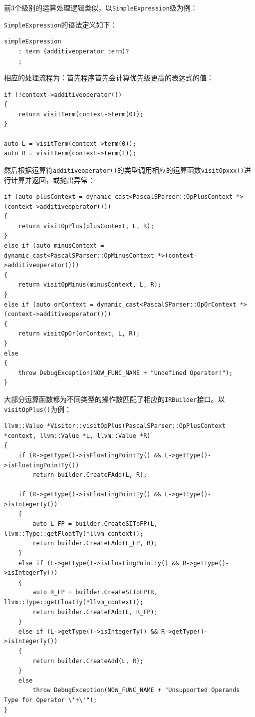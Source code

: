 \documentclass[lang=cn,11pt,a4paper,cite=authornum]{paper}
\begin{document}
前3个级别的运算处理逻辑类似，以\texttt{SimpleExpression}级为例：

\texttt{SimpleExpression}的语法定义如下：

\begin{code}
    \begin{verbatim}
simpleExpression
    : term (additiveoperator term)?
    ;
\end{verbatim}
\end{code}

相应的处理流程为：首先程序首先会计算优先级更高的表达式的值：

\begin{code}
    \begin{verbatim}
if (!context->additiveoperator())
{
    return visitTerm(context->term(0));
}

auto L = visitTerm(context->term(0));
auto R = visitTerm(context->term(1));
\end{verbatim}
\end{code}

然后根据运算符\texttt{additiveoperator()}的类型调用相应的运算函数\texttt{visitOpxxx()}进行计算并返回，或抛出异常：

\begin{code}
    \begin{verbatim}
if (auto plusContext = dynamic_cast<PascalSParser::OpPlusContext *>(context->additiveoperator()))
{
    return visitOpPlus(plusContext, L, R);
}
else if (auto minusContext = dynamic_cast<PascalSParser::OpMinusContext *>(context->additiveoperator()))
{
    return visitOpMinus(minusContext, L, R);
}
else if (auto orContext = dynamic_cast<PascalSParser::OpOrContext *>(context->additiveoperator()))
{
    return visitOpOr(orContext, L, R);
}
else
{
    throw DebugException(NOW_FUNC_NAME + "Undefined Operator!");
}
\end{verbatim}
\end{code}

大部分运算函数都为不同类型的操作数匹配了相应的\texttt{IRBuilder}接口。以\texttt{visitOpPlus()}为例：

\begin{code}
    \begin{verbatim}
llvm::Value *Visitor::visitOpPlus(PascalSParser::OpPlusContext *context, llvm::Value *L, llvm::Value *R)
{
    if (R->getType()->isFloatingPointTy() && L->getType()->isFloatingPointTy())
        return builder.CreateFAdd(L, R);

    if (R->getType()->isFloatingPointTy() && L->getType()->isIntegerTy())
    {
        auto L_FP = builder.CreateSIToFP(L, llvm::Type::getFloatTy(*llvm_context));
        return builder.CreateFAdd(L_FP, R);
    }
    else if (L->getType()->isFloatingPointTy() && R->getType()->isIntegerTy())
    {
        auto R_FP = builder.CreateSIToFP(R, llvm::Type::getFloatTy(*llvm_context));
        return builder.CreateFAdd(L, R_FP);
    }
    else if (L->getType()->isIntegerTy() && R->getType()->isIntegerTy())
    {
        return builder.CreateAdd(L, R);
    }
    else
        throw DebugException(NOW_FUNC_NAME + "Unsupported Operands Type for Operator \'+\'");
}
\end{verbatim}
\end{code}
\end{document}
